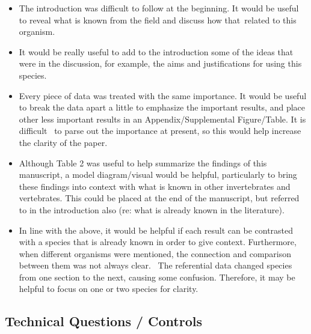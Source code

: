 \documentclass[10pt]{article}
\providecommand{\tightlist}{\setlength{\itemsep}{0pt}\setlength{\parskip}{0pt}}%
\begin{document}
\begin{itemize}
\tightlist
\item
  The introduction was difficult to follow at the beginning. It would be
  useful to reveal what is known from the field and discuss how
  that~related to this organism.
\item
  It would be really useful to add to the introduction some of the ideas
  that were in the discussion, for example, the aims and justifications
  for using this species.~
\item
  Every piece of data was treated with the same importance. It would be
  useful to break the data apart a little to emphasize the important
  results, and place other less important results in an
  Appendix/Supplemental Figure/Table. It is difficult~ to parse out the
  importance at present, so this would help increase the clarity of the
  paper.~
\item
  Although Table 2 was useful to help summarize the findings of this
  manuscript, a model diagram/visual would be helpful, particularly to
  bring these findings into context with what is known in other
  invertebrates and vertebrates. This could be placed at the end of the
  manuscript, but referred to in the introduction also (re: what is
  already known in the literature).
\item
  In line with the above, it would be helpful if each result can be
  contrasted with a species that is already known in order to give
  context. Furthermore, when different organisms were mentioned, the
  connection and comparison between them was not always clear.~ The
  referential data changed species from one section to the next, causing
  some confusion. Therefore, it may be helpful to focus on one or two
  species for clarity.~
\end{itemize}

\subsection*{Technical Questions /
Controls}

{\label{980637}}
\end{document}

